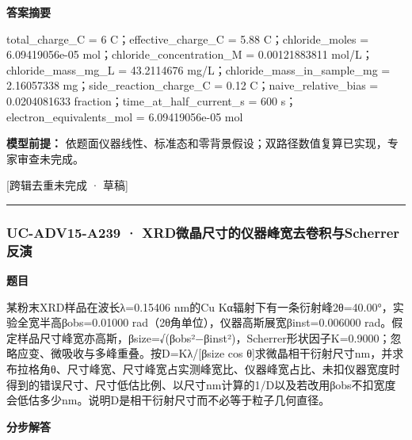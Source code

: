 \documentclass[UTF8,11pt,a4paper]{ctexart}
\begin{document}
\noindent\textbf{答案摘要}\par
total\_charge\_C = 6 C；effective\_charge\_C = 5.88 C；chloride\_moles = 6.09419056e-05 mol；chloride\_concentration\_M = 0.00121883811 mol/L；chloride\_mass\_mg\_L = 43.2114676 mg/L；chloride\_mass\_in\_sample\_mg = 2.16057338 mg；side\_reaction\_charge\_C = 0.12 C；naive\_relative\_bias = 0.0204081633 fraction；time\_at\_half\_current\_s = 600 s；electron\_equivalents\_mol = 6.09419056e-05 mol\par
\noindent\textbf{模型前提：}
依题面仪器线性、标准态和零背景假设；双路径数值复算已实现，专家审查未完成。\par
\noindent\textcolor{red!65!black}{[跨辑去重未完成 · 草稿]} \par
\medskip\hrule\medskip
{}
\subsubsection*{UC-ADV15-A239 · XRD微晶尺寸的仪器峰宽去卷积与Scherrer反演}
\noindent\textbf{题目}\par
某粉末XRD样品在波长λ=0.15406 nm的Cu Kα辐射下有一条衍射峰2θ=40.00°，实验全宽半高βobs=0.01000 rad（2θ角单位），仪器高斯展宽βinst=0.006000 rad。假定样品尺寸峰宽亦高斯，βsize=√(βobs²−βinst²)，Scherrer形状因子K=0.9000；忽略应变、微吸收与多峰重叠。按D=Kλ/[βsize cos θ]求微晶相干衍射尺寸nm，并求布拉格角θ、尺寸峰宽、尺寸峰宽占实测峰宽比、仪器峰宽占比、未扣仪器宽度时得到的错误尺寸、尺寸低估比例、以尺寸nm计算的1/D以及若改用βobs不扣宽度会低估多少nm。说明D是相干衍射尺寸而不必等于粒子几何直径。\par
\medskip\noindent\textbf{分步解答}
\end{document}
